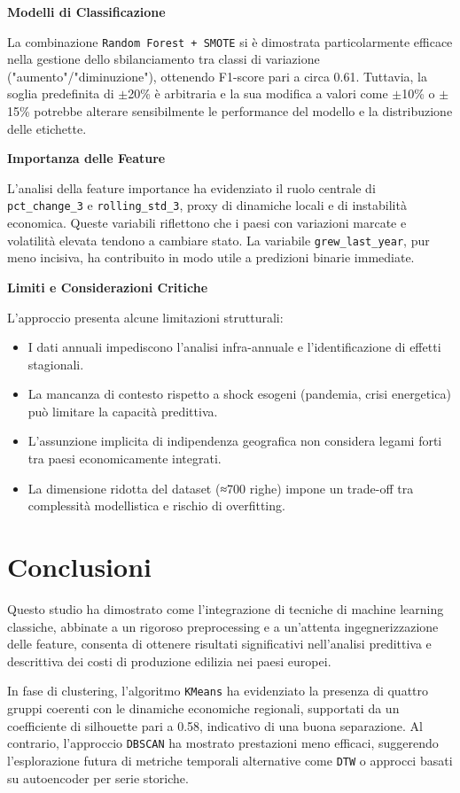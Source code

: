 \documentclass[conference]{IEEEtran}
\begin{document}
\begin{itemize}
{\noindent\textbf{Modelli di Classificazione}

La combinazione \texttt{Random Forest + SMOTE} si è dimostrata particolarmente efficace nella gestione dello sbilanciamento tra classi di variazione ("aumento"/"diminuzione"), ottenendo F1-score pari a circa 0.61. Tuttavia, la soglia predefinita di $\pm$20\% è arbitraria e la sua modifica a valori come $\pm$10\% o $\pm$15\% potrebbe alterare sensibilmente le performance del modello e la distribuzione delle etichette.

\noindent\textbf{Importanza delle Feature}

L’analisi della feature importance ha evidenziato il ruolo centrale di \texttt{pct\_change\_3} e \texttt{rolling\_std\_3}, proxy di dinamiche locali e di instabilità economica. Queste variabili riflettono che i paesi con variazioni marcate e volatilità elevata tendono a cambiare stato. La variabile \texttt{grew\_last\_year}, pur meno incisiva, ha contribuito in modo utile a predizioni binarie immediate.

\noindent\textbf{Limiti e Considerazioni Critiche}

L’approccio presenta alcune limitazioni strutturali: \begin{itemize} \item I dati annuali impediscono l’analisi infra-annuale e l’identificazione di effetti stagionali. \item La mancanza di contesto rispetto a shock esogeni (pandemia, crisi energetica) può limitare la capacità predittiva. \item L’assunzione implicita di indipendenza geografica non considera legami forti tra paesi economicamente integrati. \item La dimensione ridotta del dataset (≈700 righe) impone un trade-off tra complessità modellistica e rischio di overfitting. \end{itemize}


\section*{\LARGE \textbf{Conclusioni}}

Questo studio ha dimostrato come l'integrazione di tecniche di machine learning classiche, abbinate a un rigoroso preprocessing e a un’attenta ingegnerizzazione delle feature, consenta di ottenere risultati significativi nell’analisi predittiva e descrittiva dei costi di produzione edilizia nei paesi europei.

In fase di clustering, l’algoritmo \texttt{KMeans} ha evidenziato la presenza di quattro gruppi coerenti con le dinamiche economiche regionali, supportati da un coefficiente di silhouette pari a 0.58, indicativo di una buona separazione. Al contrario, l’approccio \texttt{DBSCAN} ha mostrato prestazioni meno efficaci, suggerendo l’esplorazione futura di metriche temporali alternative come \texttt{DTW} o approcci basati su autoencoder per serie storiche.

}
\end{itemize}
\end{document}

